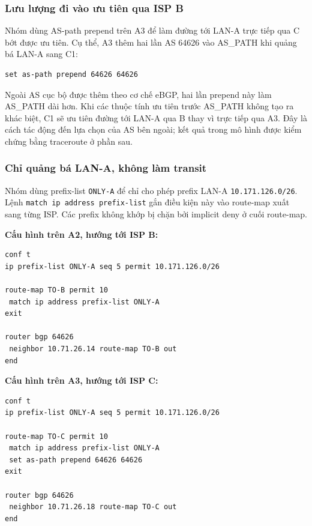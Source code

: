 \subsubsection{Lưu lượng đi vào ưu tiên qua ISP B}

Nhóm dùng AS-path prepend trên A3
để làm đường tới LAN-A trực tiếp qua C
bớt được ưu tiên.
Cụ thể, A3 thêm hai lần AS 64626
vào AS\_PATH khi quảng bá LAN-A sang C1:

\begin{lstlisting}
set as-path prepend 64626 64626
\end{lstlisting}

Ngoài AS cục bộ được thêm theo cơ chế eBGP,
hai lần prepend này làm AS\_PATH dài hơn.
Khi các thuộc tính ưu tiên trước AS\_PATH
không tạo ra khác biệt, C1 sẽ ưu tiên
đường tới LAN-A qua B thay vì trực tiếp qua A3.
Đây là cách tác động đến lựa chọn của AS bên ngoài;
kết quả trong mô hình được kiểm chứng
bằng traceroute ở phần sau.

\subsubsection{Chỉ quảng bá LAN-A, không làm transit}

Nhóm dùng prefix-list \texttt{ONLY-A}
để chỉ cho phép prefix LAN-A
\texttt{10.171.126.0/26}.
Lệnh \texttt{match ip address prefix-list}
gắn điều kiện này vào route-map xuất sang từng ISP.
Các prefix không khớp bị chặn bởi
implicit deny ở cuối route-map.

\textbf{Cấu hình trên A2, hướng tới ISP B:}

\begin{lstlisting}
conf t
ip prefix-list ONLY-A seq 5 permit 10.171.126.0/26

route-map TO-B permit 10
 match ip address prefix-list ONLY-A
exit

router bgp 64626
 neighbor 10.71.26.14 route-map TO-B out
end
\end{lstlisting}

\textbf{Cấu hình trên A3, hướng tới ISP C:}

\begin{lstlisting}
conf t
ip prefix-list ONLY-A seq 5 permit 10.171.126.0/26

route-map TO-C permit 10
 match ip address prefix-list ONLY-A
 set as-path prepend 64626 64626
exit

router bgp 64626
 neighbor 10.71.26.18 route-map TO-C out
end
\end{lstlisting}

